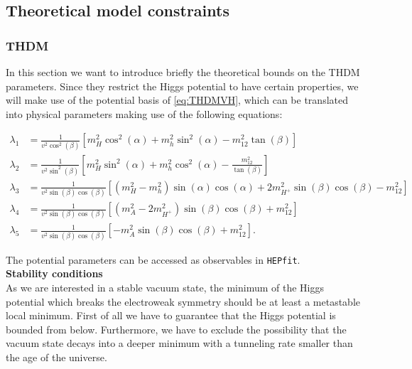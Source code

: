 \documentclass[aps,superscriptaddress,nofootinbib,floatfix,notitlepage]{revtex4-1}
\newcommand{\HEPfit}{\texttt{HEPfit}\xspace}
\begin{document}
\subsection{Theoretical model constraints}
\label{sec:theoryconstraints}

\subsubsection{THDM}

In this section we want to introduce briefly the theoretical bounds on the THDM parameters. Since they restrict the Higgs potential to have certain properties, we will make use of the potential basis of \eqref{eq:THDMVH}, which can be translated into physical parameters making use of the following equations:

\begin{align}
 \lambda_1 &=\frac{1}{v^2\cos ^2(\beta)}\left[ m_H^2\cos^2(\alpha) + m_h^2\sin^2(\alpha) - m_{12}^2\tan (\beta)\right] \label{eq:lambda1} \\
 \lambda_2 &=\frac{1}{v^2\sin ^2(\beta)}\left[ m_H^2\sin^2(\alpha) + m_h^2\cos^2(\alpha) - \frac{m_{12}^2}{\tan (\beta)}\right] \label{eq:lambda2} \\
 \lambda_3 &=\frac{1}{v^2\sin(\beta)\cos(\beta)}\left[ \left( m_H^2 - m_h^2\right) \sin(\alpha)\cos(\alpha) + 2m_{H^+}^2\sin(\beta)\cos(\beta) - m_{12}^2\right] \nonumber\\
 \lambda_4 &=\frac{1}{v^2\sin(\beta)\cos(\beta)}\left[ \left( m_A^2 - 2m_{H^+}^2\right) \sin(\beta)\cos(\beta) + m_{12}^2\right] \nonumber\\
 \lambda_5 &=\frac{1}{v^2\sin(\beta)\cos(\beta)}\left[ -m_A^2\sin(\beta)\cos(\beta) + m_{12}^2\right] \nonumber.
\end{align}

The potential parameters can be accessed as observables in \HEPfit.\\

\textbf{Stability conditions}\\

As we are interested in a stable vacuum state, the minimum of the Higgs potential which breaks the electroweak symmetry should be at least a metastable local minimum. First of all we have to guarantee that the Higgs potential is bounded from below. Furthermore, we have to exclude the possibility that the vacuum state decays into a deeper minimum with a tunneling rate smaller than the age of the universe.\\
\end{document}
